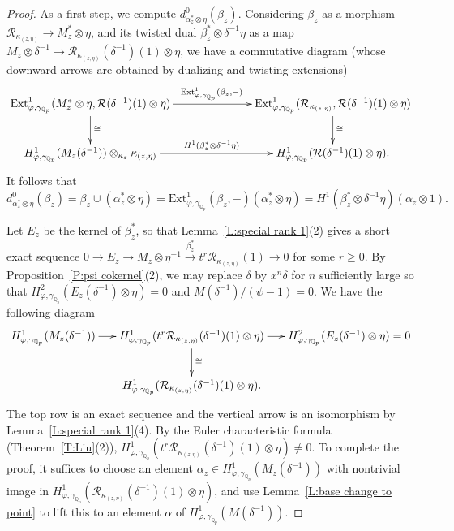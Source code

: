 \documentclass[12pt]{article}
\theoremstyle{definition}
\numberwithin{equation}{theorem}
\newcommand{\calR}{\mathcal{R}}
\newcommand{\QQ}{\mathbb{Q}}
\def\Qp{\QQ_p}
\begin{document}
\begin{proof}
As a first step, we compute $d^0_{\alpha_z^* \otimes \eta}(\beta_z)$.
Considering $\beta_z$ as a morphism $\calR_{\kappa_{(z,\eta)}} \to
M_z^* \otimes \eta$, and its twisted dual $\beta_z^* \otimes
\delta^{-1} \eta$ as a map $M_z \otimes \delta^{-1} \to
\calR_{\kappa_{(z,\eta)}}(\delta^{-1})(1) \otimes \eta$, we have a
commutative diagram (whose downward arrows are obtained by dualizing
and twisting extensions)
\[
\xymatrix@C=70pt{
\mathrm{Ext}^1_{\varphi, \gamma_{\Qp}}(M_z^* \otimes \eta,
\calR(\delta^{-1})(1) \otimes \eta) \ar[d]^\cong
\ar[r]^{\mathrm{Ext}^1_{\varphi,\gamma_{\Qp}}(\beta_z,-)} &
\mathrm{Ext}^1_{\varphi, \gamma_{\Qp}}(\calR_{\kappa_{(z,\eta)}},
\calR(\delta^{-1})(1) \otimes \eta ) \ar[d]^\cong
\\
H^1_{\varphi, \gamma_{\Qp}}(M_z (\delta^{-1}) ) \otimes_{\kappa_z}
\kappa_{(z,\eta)} \ar[r]^{H^1(\beta_z^* \otimes \delta^{-1} \eta)}
& H^1_{\varphi,\gamma_{\Qp}}( \calR(\delta^{-1})(1) \otimes \eta).
}
\]
It follows that
\[
d^0_{\alpha_z^* \otimes \eta}(\beta_z) = \beta_z \cup (\alpha_z^*
\otimes \eta) =
\mathrm{Ext}^1_{\varphi,\gamma_{\Qp}}(\beta_z,-)(\alpha_z^* \otimes
\eta) = H^1(\beta_z^* \otimes \delta^{-1}\eta)(\alpha_z
\otimes 1).
\]

Let $E_z$ be the kernel of $\beta_z^*$, so that Lemma~\ref{L:special
  rank 1}(2) gives a short exact sequence $0 \to E_z \to M_z \otimes
\eta^{-1} \xrightarrow{\beta_z^*} t^r \calR_{\kappa_{(z, \eta)}}(1)
\to 0$ for some $r \geq 0$.  By Proposition~\ref{P:psi cokernel}(2),
we may replace $\delta$ by $x^n\delta$ for $n$ sufficiently large so
that $H^2_{\varphi, \gamma_{\Qp}}(E_z(\delta^{-1}) \otimes \eta) = 0$
and $M(\delta^{-1}) / (\psi-1) = 0$.  We have the following diagram
\begin{equation}
\label{E:devissage}
\xymatrix@C=15pt{
H^1_{\varphi, \gamma_{\Qp}}(M_z(\delta^{-1})) \ar[r] &
H^1_{\varphi, \gamma_{\Qp}}(t^r\calR_{\kappa_{(z,\eta)}}(\delta^{-1})(1)\otimes \eta) \ar[d]^{\cong}\ar[r] &
H^2_{\varphi, \gamma_{\Qp}}(E_z(\delta^{-1}) \otimes \eta) = 0\\
& H^1_{\varphi, \gamma_{\Qp}}(\calR_{\kappa_{(z,\eta)}}(\delta^{-1})(1)\otimes \eta).
}
\end{equation}
The top row is an exact sequence and the vertical arrow is an
isomorphism by Lemma~\ref{L:special rank 1}(4).  By the Euler
characteristic formula (Theorem~\ref{T:Liu}(2)), $H^1_{\varphi,
  \gamma_{\Qp}}(t^r \calR_{\kappa_{(z,\eta)}}(\delta^{-1})(1)\otimes
\eta) \neq 0$.  To complete the proof, it suffices to choose an
element $\alpha_z \in H^1_{\varphi, \gamma_{\Qp}}(M_z(\delta^{-1}))$
with nontrivial image in $H^1_{\varphi,
  \gamma_{\Qp}}(\calR_{\kappa_{(z,\eta)}}(\delta^{-1})(1)\otimes
\eta)$, and use Lemma~\ref{L:base change to point} to lift this
to an element $\alpha$ of $H^1_{\varphi,
  \gamma_{\Qp}}(M(\delta^{-1}))$.
\end{proof}
\end{document}
